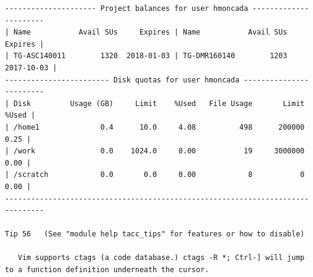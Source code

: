 \documentclass{article}
\begin{document}
\begin{enumerate}
\begin{verbatim}
--------------------- Project balances for user hmoncada ----------------------
| Name           Avail SUs     Expires | Name           Avail SUs     Expires |
| TG-ASC140011        1320  2018-01-03 | TG-DMR160140        1203  2017-10-03 | 
------------------------ Disk quotas for user hmoncada ------------------------
| Disk         Usage (GB)     Limit    %Used   File Usage       Limit   %Used |
| /home1              0.4      10.0     4.08          498      200000    0.25 |
| /work               0.0    1024.0     0.00           19     3000000    0.00 |
| /scratch            0.0       0.0     0.00            8           0    0.00 |
-------------------------------------------------------------------------------

Tip 56   (See "module help tacc_tips" for features or how to disable)

   Vim supports ctags (a code database.) ctags -R *; Ctrl-] will jump to a function definition underneath the cursor.


\end{verbatim}
\end{enumerate}
\end{document}
